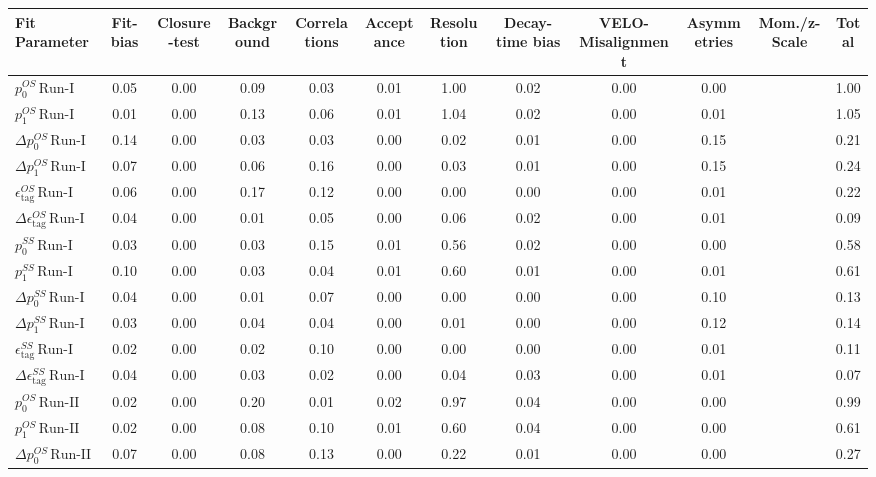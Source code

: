 \begin{tabular}{l  c  c  c  c  c  c  c  c  c  c  | c }
\hline
\hline
Fit Parameter & Fit-bias & Closure-test & Background & Correlations & Acceptance & Resolution & Decay-time bias & VELO-Misalignment & Asymmetries & Mom./z-Scale &  Total  \\ 
\hline
$p_{0}^{OS} \, \text{Run-I}$ & 0.05 & 0.00 & 0.09 & 0.03 & 0.01 & 1.00 & 0.02 & 0.00 & 0.00 &  & 1.00 \\ 
$p_{1}^{OS} \, \text{Run-I}$ & 0.01 & 0.00 & 0.13 & 0.06 & 0.01 & 1.04 & 0.02 & 0.00 & 0.01 &  & 1.05 \\ 
$\Delta p_{0}^{OS} \, \text{Run-I}$ & 0.14 & 0.00 & 0.03 & 0.03 & 0.00 & 0.02 & 0.01 & 0.00 & 0.15 &  & 0.21 \\ 
$\Delta p_{1}^{OS} \, \text{Run-I}$ & 0.07 & 0.00 & 0.06 & 0.16 & 0.00 & 0.03 & 0.01 & 0.00 & 0.15 &  & 0.24 \\ 
$\epsilon_{\text{tag}}^{OS} \, \text{Run-I}$ & 0.06 & 0.00 & 0.17 & 0.12 & 0.00 & 0.00 & 0.00 & 0.00 & 0.01 &  & 0.22 \\ 
$\Delta \epsilon_{\text{tag}}^{OS} \, \text{Run-I}$ & 0.04 & 0.00 & 0.01 & 0.05 & 0.00 & 0.06 & 0.02 & 0.00 & 0.01 &  & 0.09 \\ 
$p_{0}^{SS} \, \text{Run-I}$ & 0.03 & 0.00 & 0.03 & 0.15 & 0.01 & 0.56 & 0.02 & 0.00 & 0.00 &  & 0.58 \\ 
$p_{1}^{SS} \, \text{Run-I}$ & 0.10 & 0.00 & 0.03 & 0.04 & 0.01 & 0.60 & 0.01 & 0.00 & 0.01 &  & 0.61 \\ 
$\Delta p_{0}^{SS} \, \text{Run-I}$ & 0.04 & 0.00 & 0.01 & 0.07 & 0.00 & 0.00 & 0.00 & 0.00 & 0.10 &  & 0.13 \\ 
$\Delta p_{1}^{SS} \, \text{Run-I}$ & 0.03 & 0.00 & 0.04 & 0.04 & 0.00 & 0.01 & 0.00 & 0.00 & 0.12 &  & 0.14 \\ 
$\epsilon_{\text{tag}}^{SS} \, \text{Run-I}$ & 0.02 & 0.00 & 0.02 & 0.10 & 0.00 & 0.00 & 0.00 & 0.00 & 0.01 &  & 0.11 \\ 
$\Delta \epsilon_{\text{tag}}^{SS} \, \text{Run-I}$ & 0.04 & 0.00 & 0.03 & 0.02 & 0.00 & 0.04 & 0.03 & 0.00 & 0.01 &  & 0.07 \\ 
$p_{0}^{OS} \, \text{Run-II}$ & 0.02 & 0.00 & 0.20 & 0.01 & 0.02 & 0.97 & 0.04 & 0.00 & 0.00 &  & 0.99 \\ 
$p_{1}^{OS} \, \text{Run-II}$ & 0.02 & 0.00 & 0.08 & 0.10 & 0.01 & 0.60 & 0.04 & 0.00 & 0.00 &  & 0.61 \\ 
$\Delta p_{0}^{OS} \, \text{Run-II}$ & 0.07 & 0.00 & 0.08 & 0.13 & 0.00 & 0.22 & 0.01 & 0.00 & 0.00 &  & 0.27 \\ 

\end{tabular}
